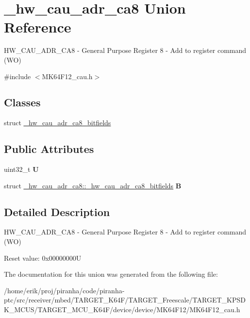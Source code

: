 \hypertarget{union__hw__cau__adr__ca8}{}\section{\+\_\+hw\+\_\+cau\+\_\+adr\+\_\+ca8 Union Reference}
\label{union__hw__cau__adr__ca8}


H\+W\+\_\+\+C\+A\+U\+\_\+\+A\+D\+R\+\_\+\+C\+A8 -\/ General Purpose Register 8 -\/ Add to register command (WO)  




{\ttfamily \#include $<$M\+K64\+F12\+\_\+cau.\+h$>$}

\subsection*{Classes}
\begin{DoxyCompactItemize}
\item 
struct \hyperlink{struct__hw__cau__adr__ca8_1_1__hw__cau__adr__ca8__bitfields}{\+\_\+hw\+\_\+cau\+\_\+adr\+\_\+ca8\+\_\+bitfields}
\end{DoxyCompactItemize}
\subsection*{Public Attributes}
\begin{DoxyCompactItemize}
\item 
uint32\+\_\+t {\bfseries U}\hypertarget{union__hw__cau__adr__ca8_a1ff1f4085d5ffd11b4c16129d61aaae6}{}\label{union__hw__cau__adr__ca8_a1ff1f4085d5ffd11b4c16129d61aaae6}

\item 
struct \hyperlink{struct__hw__cau__adr__ca8_1_1__hw__cau__adr__ca8__bitfields}{\+\_\+hw\+\_\+cau\+\_\+adr\+\_\+ca8\+::\+\_\+hw\+\_\+cau\+\_\+adr\+\_\+ca8\+\_\+bitfields} {\bfseries B}\hypertarget{union__hw__cau__adr__ca8_a3884f3aab517274b8172fdadadb5b0d5}{}\label{union__hw__cau__adr__ca8_a3884f3aab517274b8172fdadadb5b0d5}

\end{DoxyCompactItemize}


\subsection{Detailed Description}
H\+W\+\_\+\+C\+A\+U\+\_\+\+A\+D\+R\+\_\+\+C\+A8 -\/ General Purpose Register 8 -\/ Add to register command (WO) 

Reset value\+: 0x00000000U 

The documentation for this union was generated from the following file\+:\begin{DoxyCompactItemize}
\item 
/home/erik/proj/piranha/code/piranha-\/ptc/src/receiver/mbed/\+T\+A\+R\+G\+E\+T\+\_\+\+K64\+F/\+T\+A\+R\+G\+E\+T\+\_\+\+Freescale/\+T\+A\+R\+G\+E\+T\+\_\+\+K\+P\+S\+D\+K\+\_\+\+M\+C\+U\+S/\+T\+A\+R\+G\+E\+T\+\_\+\+M\+C\+U\+\_\+\+K64\+F/device/device/\+M\+K64\+F12/M\+K64\+F12\+\_\+cau.\+h\end{DoxyCompactItemize}
